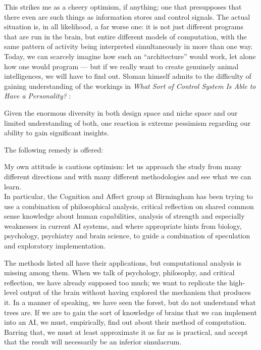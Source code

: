 This strikes me as a cheery optimism, if anything; one that presupposes that there even are such things as information stores and control signals. The actual situation is, in all likelihood, a far worse one: it is not just different programs that are run in the brain, but entire different models of computation, with the same pattern of activity being interpreted simultaneously in more than one way.
Today, we can scarcely imagine how such an ``architecture'' would work, let alone how one would program --- but if we really want to create genuinely animal intelligences, we will have to find out. Sloman himself admits to the difficulty of gaining understanding of the workings in {\em What Sort of Control System Is Able to Have a Personality?} \cite[p.\ 6, Section 9 ``Is the task too hard?'']{sloman1997}:
\begin{emquote}
Given the enormous diversity in both design space and niche space and our limited understanding of both, one reaction is extreme pessimism regarding our ability to gain significant insights.
\end{emquote}
The following remedy is offered:
\begin{emquote}
My own attitude is cautious optimism: let us approach the study from many different directions and with many different methodologies and see what we can learn. \ellipses\\
In particular, the Cognition and Affect group at Birmingham has been trying to use a combination of philosophical analysis, critical reflection on shared common sense knowledge about human capabilities, analysis of strength and especially weaknesses in current AI systems, and where appropriate hints from biology, psychology, psychiatry and brain science, to guide a combination of speculation and exploratory implementation. \ellipses
\end{emquote}

The methods listed all have their applications, but computational analysis is missing among them. When we talk of psychology, philosophy, and critical reflection, we have already supposed too much; we want to replicate the high-level output of the brain without having explored the mechanism that produces it. In a manner of speaking, we have seen the forest, but do not understand what trees are. If we are to gain the sort of knowledge of brains that we can implement into an AI, we must, empirically, find out about their method of computation. Barring that, we must at least approximate it as far as is practical, and accept that the result will necessarily be an inferior simulacrum.

